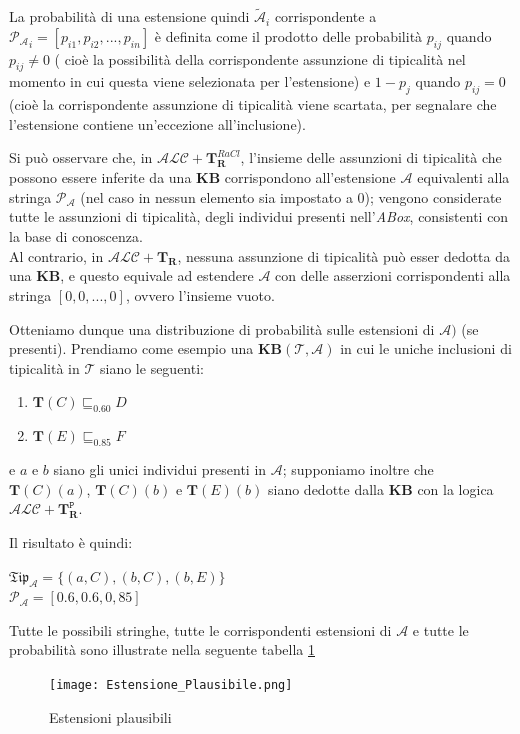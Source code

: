 La probabilità di una estensione quindi $ \mathcal{\widetilde{A}}_i $ corrispondente a 
$ \mathcal{P_{A}}_i  = [p_{i1},p_{i2}, . . . ,p_{in}] $ è definita come il prodotto delle probabilità 
$ p_{ij} $ quando $ p_{ij} \neq 0 $ ( cioè la possibilità della corrispondente assunzione di 
tipicalità nel momento in cui questa viene selezionata per l’estensione) e $ 1 - p_j $ quando $ p_{ij} = 0 $ (cioè la corrispondente assunzione di tipicalità viene scartata, per segnalare che 
l’estensione contiene un’eccezione all'inclusione).

Si può osservare che, in $ \mathcal{ALC} + \mathbf{T}_{\mathbf{R}}^{\mathit{RaCl}} $, 
l’insieme delle assunzioni di tipicalità che
possono essere inferite da una \textbf{KB} corrispondono all'estensione $ \mathcal{A} $ equivalenti alla
stringa $ \mathcal{P_{A}} $ (nel caso in nessun elemento sia impostato a 0);
vengono considerate tutte le assunzioni di tipicalità,
degli individui presenti nell’\textit{ABox}, consistenti con la base di conoscenza.\\
Al contrario, in $ \mathcal{ALC} + \mathbf{T}_{\mathbf{R}} $, nessuna assunzione di tipicalità può esser dedotta
da una \textbf{KB}, e questo equivale ad estendere $ \mathcal{A} $ con delle asserzioni corrispondenti alla
stringa $ [0, 0, . . . , 0] $, ovvero l'insieme vuoto.

Otteniamo dunque una distribuzione di probabilità sulle estensioni di $ \mathcal{A})$ (se presenti).
Prendiamo come esempio una $ \textbf{KB} (\mathcal{T} , \mathcal{A}) $ in cui le uniche 
inclusioni di tipicalità in $ \mathcal{T} $ siano le seguenti:
\begin{enumerate}
	\item $ \mathbf{T}(C) \sqsubseteq_{0.60} D $
	\item $ \mathbf{T}(E) \sqsubseteq_{0.85} F $
\end{enumerate}
e $ a $ e $ b $ siano gli unici individui presenti in $ \mathcal{A} $; supponiamo inoltre che $ \mathbf{T}(C)(a) $, 
$ \mathbf{T}(C)(b) $ e $ \mathbf{T}(E)(b) $ siano dedotte dalla \textbf{KB} con la logica 
$ \mathcal{ALC} + \mathbf{T}_{\mathbf{R}}^{\mathtt{P}} $.

Il risultato è quindi:
\begin{multicols}{2}
	$ \mathfrak{Tip}_{\mathcal{A}} = \{(a,C),(b,C),(b,E)\} $ \\
	$ \mathcal{P_{A}} = [0.6, 0.6, 0,85] $
\end{multicols}
Tutte le possibili stringhe, tutte le corrispondenti estensioni di $ \mathcal{A} $ e tutte le probabilità 
sono illustrate nella seguente tabella \ref{fig:estesioni}
\clearpage
\begin{figure}[t]
	\texttt{[image: Estensione\_Plausibile.png]}
	\caption{Estensioni plausibili}
	\label{fig:estesioni}
	\centering
\end{figure}

